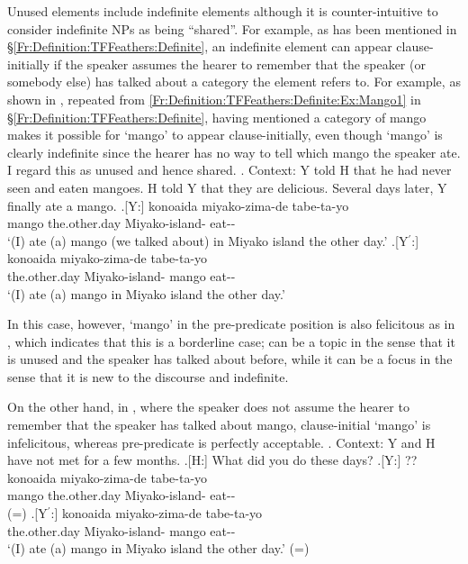 Unused elements include indefinite elements
although it is counter-intuitive to consider indefinite NPs as being ``shared''.
For example, as has been mentioned in \S \ref{Fr:Definition:TFFeathers:Definite},
an indefinite element can appear clause-initially
if the speaker assumes the hearer to remember that the speaker (or somebody else) has talked about a category the element refers to.
For example, as shown in \Next[Y],
repeated from \ref{Fr:Definition:TFFeathers:Definite:Ex:Mango1} in \S \ref{Fr:Definition:TFFeathers:Definite},
having mentioned a category of mango makes it possible for  `mango' to appear clause-initially,
even though
 `mango' is clearly indefinite
since the hearer has no way to tell which mango the speaker ate.
I regard this as unused and hence shared.
%
\ex. Context:
	Y told H that he had never seen and eaten mangoes.
	H told Y that they are delicious.
	Several days later, Y finally ate a mango.
	\ag.[Y:]  konoaida miyako-zima-de tabe-ta-yo \\
			mango the.other.day Miyako-island- eat-- \\
			`(I) ate (a) mango (we talked about) in Miyako island the other day.'
	\bg.[Y$^{\prime}$:] konoaida miyako-zima-de  tabe-ta-yo \\
			the.other.day Miyako-island- mango eat-- \\
			`(I) ate (a) mango in Miyako island the other day.'

In this case, however,
 `mango' in the pre-predicate position is also felicitous
as in \Last[$^{\prime}$],
which indicates that this is a borderline case;
 can be a topic in the sense that
it is unused and the speaker has talked about before,
while it can be a focus in the sense that
it is new to the discourse and indefinite.

On the other hand, in \Next[Y],
where the speaker does not assume the hearer to remember that
the speaker has talked about mango,
clause-initial  `mango' is infelicitous,
whereas pre-predicate  is perfectly acceptable.
%
\ex. Context:
	Y and H have not met for a few months.
	\a.[H:] What did you do these days?
	\bg.[Y:] ?? konoaida miyako-zima-de tabe-ta-yo \\
			mango the.other.day Miyako-island- eat-- \\
		\hfill(=\LLast[Y])
	\bg.[Y$^{\prime}$:] konoaida miyako-zima-de  tabe-ta-yo \\
			the.other.day Miyako-island- mango eat-- \\
			`(I) ate (a) mango in Miyako island the other day.'
		\hfill(=\LLast[Y$^{\prime}$])


